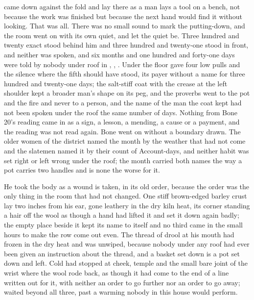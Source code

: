 
 came down against the fold and lay there as a man lays a tool on a bench, not because the work was finished but because the next hand would find it without looking. That was all. There was no small sound to mark the putting-down, and the room went on with its own quiet, and  let the quiet be. Three hundred and twenty exact stood behind him and three hundred and twenty-one stood in front, and neither was spoken, and six months and one hundred and forty-one days were told by nobody under  roof in , , . Under the floor  gave four low pulls and the silence where the fifth should have stood, its payer without a name for three hundred and twenty-one days; the salt-stiff coat with the crease at the left shoulder kept a broader man's shape on its peg, and the proverbs went to the pot and the fire and never to a person, and the name of the man the coat kept had not been spoken under the roof the same number of days. Nothing from Bone 20's reading came in as a sign, a lesson, a mending, a cause or a payment, and the reading was not read again. Bone went on without a boundary drawn. The older women of the district named the month by the weather that had not come and the slatemen named it by their count of Account-days, and neither habit was set right or left wrong under the roof; the month carried both names the way a pot carries two handles and is none the worse for it.

He took the body as a wound is taken, in its old order, because the order was the only thing in the room that had not changed. One stiff brown-edged barley crust lay two inches from his ear, gone leathery in the dry kiln heat, its corner standing a hair off the wool as though a hand had lifted it and set it down again badly; the empty place beside it kept its name to itself and no third came in the small hours to make the row come out even. The thread of drool at his mouth had frozen in the dry heat and was unwiped, because nobody under any roof had ever been given an instruction about the thread, and a basket set down is a pot set down and left. Cold had stopped at cheek, temple and the small bare joint of the wrist where the wool rode back, as though it had come to the end of a line written out for it, with neither an order to go further nor an order to go away;  waited beyond all three, past a warming nobody in this house would perform.

